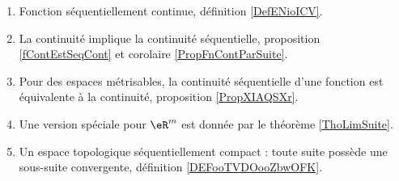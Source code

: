 
\begin{enumerate}
	\item
	      Fonction séquentiellement continue, définition \ref{DefENioICV}.
	\item
	      La continuité implique la continuité séquentielle, proposition \ref{fContEstSeqCont} et corolaire \ref{PropFnContParSuite}.
	\item
	      Pour des espaces métrisables, la continuité séquentielle d'une fonction est équivalente à la continuité, proposition \ref{PropXIAQSXr}.
	\item
	      Une version spéciale pour \( \eR^m\) est donnée par le théorème \ref{ThoLimSuite}.
      \item
          Un espace topologique séquentiellement compact : toute suite possède une sous-suite convergente, définition \ref{DEFooTVDOooZbwOFK}.
\end{enumerate}


